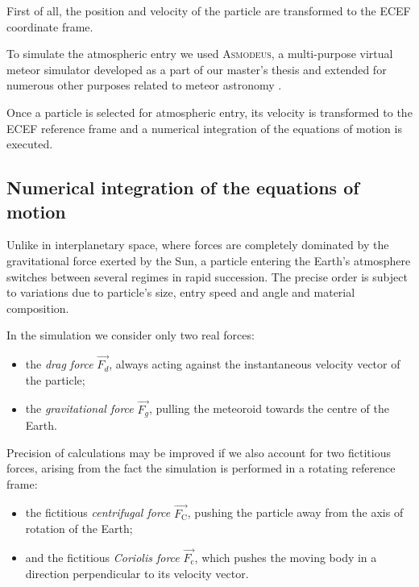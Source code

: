     First of all, the position and velocity of the particle are transformed to the ECEF coordinate frame.

    To simulate the atmospheric entry we used \textsc{Asmodeus},
    a multi-purpose virtual meteor simulator developed as a part of our master's thesis and extended for numerous
    other purposes related to meteor astronomy \citep{balaz-thesis,balaz+2020}.

    Once a particle is selected for atmospheric entry, its velocity is transformed to the ECEF reference frame
    and a numerical integration of the equations of motion is executed.

    \subsection{Numerical integration of the equations of motion} \label{sai}
        Unlike in interplanetary space, where forces are completely dominated by the gravitational force exerted by the Sun,
        a particle entering the Earth's atmosphere switches between several regimes in rapid succession.
        The precise order is subject to variations due to particle's size, entry speed and angle
        and material composition.

        In the simulation we consider only two real forces:
        \begin{itemize}
            \item the \emph{drag force} $\vec{F_d}$, always acting against the instantaneous velocity vector of the particle;
            \item the \emph{gravitational force} $\vec{F_g}$, pulling the meteoroid towards the centre of the Earth.
        \end{itemize}

        Precision of calculations may be improved if we also account for two fictitious forces,
        arising from the fact the simulation is performed in a rotating reference frame:
        \begin{itemize}
            \item the fictitious \emph{centrifugal force} $\vec{F_{\mathrm{C}}}$,
                pushing the particle away from the axis of rotation of the Earth;
            \item and the fictitious \emph{Coriolis force} $\vec{F_{\mathrm{c}}}$,
                which pushes the moving body in a direction perpendicular to its velocity vector.
        \end{itemize}

